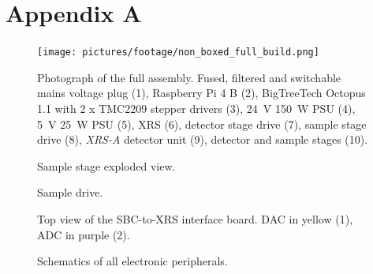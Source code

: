 \chapter{Appendix A}\label{sec:appendix a}
    
    \newpage
    \begin{figure}[ht]
        \centering
        \texttt{[image: pictures/footage/non\_boxed\_full\_build.png]}
        \caption[Photograph of the full assembly]{Photograph of the full assembly. Fused, filtered and switchable mains voltage plug (1), Raspberry Pi 4 B (2), BigTreeTech Octopus 1.1 with 2 x TMC2209 stepper drivers (3), \qty{24}{\volt} \qty{150}{\watt} PSU (4), \qty{5}{\volt} \qty{25}{\watt} PSU (5), XRS (6), detector stage drive (7), sample stage drive (8), \textit{XRS-A} detector unit (9), detector and sample stages (10).}%
        \label{fig:non boxed full assembly}
    \end{figure}
    \newpage
    \begin{figure}[ht]
        \centering
        \caption[Sample stage exploded view]{Sample stage exploded view.}%
        \label{fig:sample stage exploded}%
    \end{figure}
    \newpage
    \begin{figure}[ht]
        \centering
        \caption[Sample drive]{Sample drive.}%
        \label{fig:sample drive}%
    \end{figure}
    \newpage
    \begin{figure}[ht]
        \centering
        
        \caption[Top view of the SBC-to-XRS interface board]{Top view of the SBC-to-XRS interface board. DAC in yellow (1), ADC in purple (2).}%
        \label{fig:top view interface board}
    \end{figure}
    \newpage
    \begin{figure}[ht]
        \centering
        
        \caption[Schematics of all electronic peripherals]{Schematics of all electronic peripherals.}%
        \label{fig:schematics of peripherals}
    \end{figure}
